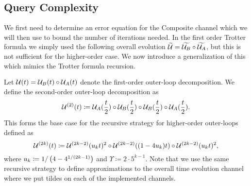 \subsection{Query Complexity} \label{sec:higher_order_complexity}
We first need to determine an error equation for the Composite channel which we will then use to bound the number of iterations needed. In the first
order Trotter formula we simply used the following overall evolution $\widetilde{\mathcal{U}} = \widetilde{\mathcal{U}_B} \circ \widetilde{\mathcal{U}_A}$, but this is
not sufficient for the higher-order case. We now introduce a generalization of this which mimics the Trotter formula recursion.
\begin{definition}\label{def:higher_order_loop}
Let $\mathcal{U}(t) = \mathcal{U}_B(t) \circ \mathcal{U}_A(t)$ denote the first-order outer-loop decomposition. We define the second-order outer-loop decomposition as
\begin{equation}
    \mathcal{U}^{(2)}(t) \coloneqq \mathcal{U}_A(\frac{t}{2}) \circ \mathcal{U}_B(\frac{t}{2}) \circ \mathcal{U}_B(\frac{t}{2}) \circ \mathcal{U}_A(\frac{t}{2}).
\end{equation}
This forms the base case for the recursive strategy for higher-order outer-loops defined as
\begin{equation}
    \mathcal{U}^{(2k)}(t) \coloneqq \mathcal{U}^{(2k - 2)}(u_k t)^2 \circ \mathcal{U}^{(2k - 2)}((1 - 4 u_k ) t) \circ \mathcal{U}^{(2k - 2)}(u_k t)^2,
\end{equation}
where $u_k \coloneqq 1 / \left( 4-4^{1/(2k - 1)} \right)$ and $\Upsilon \coloneqq 2 \cdot 5^{k-1}$. Note that we use the same recursive strategy to define approximations
to the overall time evolution channel where we put tildes on each of the implemented channels.
\end{definition}

